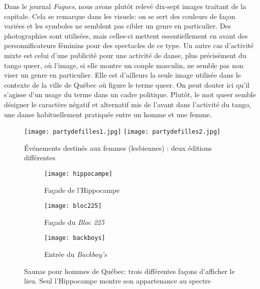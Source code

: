 Dans le journal \emph{Fugues}, nous avons plutôt relevé dix-sept images traitant de la capitale.
Cela se remarque dans les visuels: on se sert des couleurs de façon variées et les symboles ne semblent pas cibler un genre en particulier.
Des photographies sont utilisées, mais celles-ci mettent essentiellement en avant des personnificateurs féminins pour des spectacles de ce type.
Un autre cas d'activité mixte est celui d'une publicité pour une activité de danse, plus précisément du tango queer, où l'image, si elle montre un couple masculin, ne semble pas non viser un genre en particulier.
Elle est d'ailleurs la seule image utilisée dans le contexte de la ville de Québec où figure le terme queer.
On peut douter ici qu'il s'agisse d'un usage du terme dans un cadre politique.
Plutôt, le mot queer semble désigner le caractère négatif et alternatif mis de l'avant dans l'activité du tango, une danse habituellement pratiquée entre un homme et une femme.

\begin{figure}[ht]
  \centering
  {\texttt{[image: partydefilles1.jpg]}}
  {\texttt{[image: partydefilles2.jpg]}}
  \caption[Événements destinés aux femmes (lesbiennes)]{Événements destinés aux femmes (lesbiennes) : deux éditions différentes}\label{figs:partydefilles}
\end{figure}

\begin{figure}[ht]
  \centering
  \begin{subfigure}[b]{.45\linewidth}
    \texttt{[image: hippocampe]}
    \caption{Façade de l'Hippocampe\label{fig:hippocampe}}
  \end{subfigure}

  \begin{subfigure}[b]{.45\linewidth}
    \texttt{[image: bloc225]}
    \caption{Façade du \emph{Bloc 225}\label{fig:bloc225}}
  \end{subfigure}
  \begin{subfigure}[b]{.45\linewidth}
    \texttt{[image: backboys]}
    \caption{Entrée du \emph{Backboy's}\label{fig:backboys}}
  \end{subfigure}
  \caption[Saunas pour hommes de Québec]{Saunas pour hommes de Québec: trois différentes façons d'afficher le lieu. Seul l'Hippocampe montre son appartenance au spectre \lgbt{}}\label{figs:saunas}
\end{figure}


